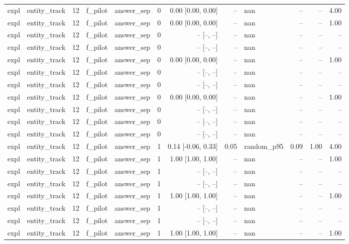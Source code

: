 \begin{tabular}{llrllrrrlrrr}
expl & entity\_track & 12 & f\_pilot & answer\_sep & 0 & 0.00 [0.00, 0.00] & -- & nan & -- & -- & 4.00 \\
expl & entity\_track & 12 & f\_pilot & answer\_sep & 0 & 0.00 [0.00, 0.00] & -- & nan & -- & -- & 1.00 \\
expl & entity\_track & 12 & f\_pilot & answer\_sep & 0 & -- [--, --] & -- & nan & -- & -- & -- \\
expl & entity\_track & 12 & f\_pilot & answer\_sep & 0 & -- [--, --] & -- & nan & -- & -- & -- \\
expl & entity\_track & 12 & f\_pilot & answer\_sep & 0 & 0.00 [0.00, 0.00] & -- & nan & -- & -- & 1.00 \\
expl & entity\_track & 12 & f\_pilot & answer\_sep & 0 & -- [--, --] & -- & nan & -- & -- & -- \\
expl & entity\_track & 12 & f\_pilot & answer\_sep & 0 & -- [--, --] & -- & nan & -- & -- & -- \\
expl & entity\_track & 12 & f\_pilot & answer\_sep & 0 & 0.00 [0.00, 0.00] & -- & nan & -- & -- & 1.00 \\
expl & entity\_track & 12 & f\_pilot & answer\_sep & 0 & -- [--, --] & -- & nan & -- & -- & -- \\
expl & entity\_track & 12 & f\_pilot & answer\_sep & 0 & -- [--, --] & -- & nan & -- & -- & -- \\
expl & entity\_track & 12 & f\_pilot & answer\_sep & 0 & -- [--, --] & -- & nan & -- & -- & -- \\
expl & entity\_track & 12 & f\_pilot & answer\_sep & 1 & 0.14 [-0.06, 0.33] & 0.05 & random\_p95 & 0.09 & 1.00 & 4.00 \\
expl & entity\_track & 12 & f\_pilot & answer\_sep & 1 & 1.00 [1.00, 1.00] & -- & nan & -- & -- & 1.00 \\
expl & entity\_track & 12 & f\_pilot & answer\_sep & 1 & -- [--, --] & -- & nan & -- & -- & -- \\
expl & entity\_track & 12 & f\_pilot & answer\_sep & 1 & -- [--, --] & -- & nan & -- & -- & -- \\
expl & entity\_track & 12 & f\_pilot & answer\_sep & 1 & 1.00 [1.00, 1.00] & -- & nan & -- & -- & 1.00 \\
expl & entity\_track & 12 & f\_pilot & answer\_sep & 1 & -- [--, --] & -- & nan & -- & -- & -- \\
expl & entity\_track & 12 & f\_pilot & answer\_sep & 1 & -- [--, --] & -- & nan & -- & -- & -- \\
expl & entity\_track & 12 & f\_pilot & answer\_sep & 1 & 1.00 [1.00, 1.00] & -- & nan & -- & -- & 1.00 \\

\end{tabular}
